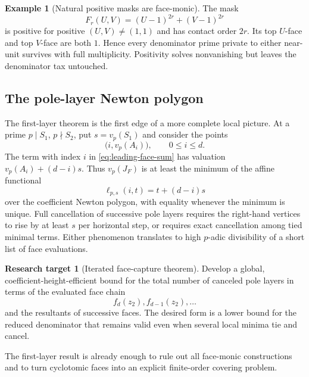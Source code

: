 \documentclass[11pt,oneside]{article}
\theoremstyle{definition}
\newtheorem{example}[theorem]{Example}
\newtheorem{target}[theorem]{Research target}
\theoremstyle{remark}
\begin{document}
\begin{example}[Natural positive masks are face-monic]
The mask
\begin{equation}
 F_r(U,V)=(U-1)^{2r}+(V-1)^{2r}
 \label{eq:basic-positive-mask}
\end{equation}
is positive for positive $(U,V)\ne(1,1)$ and has contact order $2r$.  Its top $U$-face and
top $V$-face are both $1$.  Hence every denominator prime private to either near-unit
survives with full multiplicity.  Positivity solves nonvanishing but leaves the denominator
tax untouched.
\end{example}

\subsection{The pole-layer Newton polygon}

The first-layer theorem is the first edge of a more complete local picture.  At a prime
$p\mid S_1$, $p\nmid S_2$, put $s=v_p(S_1)$ and consider the points
\begin{equation}
 \bigl(i,v_p(A_i)\bigr),\qquad 0\le i\le d.
 \label{eq:pole-layer-points}
\end{equation}
The term with index $i$ in \eqref{eq:leading-face-sum} has valuation
$v_p(A_i)+(d-i)s$.  Thus $v_p(J_F)$ is at least the minimum of the affine functional
\begin{equation}
 \ell_{p,s}(i,t)=t+(d-i)s
 \label{eq:pole-functional}
\end{equation}
over the coefficient Newton polygon, with equality whenever the minimum is unique.  Full
cancellation of successive pole layers requires the right-hand vertices to rise by at least
$s$ per horizontal step, or requires exact cancellation among tied minimal terms.  Either
phenomenon translates to high $p$-adic divisibility of a short list of face evaluations.

\begin{target}[Iterated face-capture theorem]
\label{target:iterated-face}
Develop a global, coefficient-height-efficient bound for the total number of canceled pole
layers in terms of the evaluated face chain
\[
 f_d(z_2),f_{d-1}(z_2),\ldots
\]
and the resultants of successive faces.  The desired form is a lower bound for the reduced
denominator that remains valid even when several local minima tie and cancel.
\end{target}

The first-layer result is already enough to rule out all face-monic constructions and to
turn cyclotomic faces into an explicit finite-order covering problem.
\end{document}
